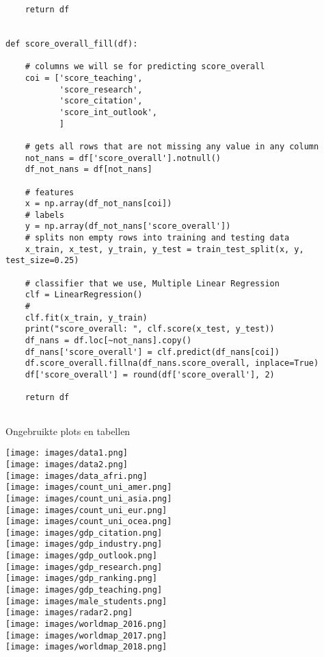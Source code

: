\documentclass{uva-inf-article}
\begin{document}
\begin{lstlisting}
    return df


def score_overall_fill(df):

    # columns we will se for predicting score_overall
    coi = ['score_teaching',
           'score_research',
           'score_citation',
           'score_int_outlook',
           ]

    # gets all rows that are not missing any value in any column
    not_nans = df['score_overall'].notnull()
    df_not_nans = df[not_nans]

    # features
    x = np.array(df_not_nans[coi])
    # labels
    y = np.array(df_not_nans['score_overall'])
    # splits non empty rows into training and testing data
    x_train, x_test, y_train, y_test = train_test_split(x, y, test_size=0.25)

    # classifier that we use, Multiple Linear Regression
    clf = LinearRegression()
    # 
    clf.fit(x_train, y_train)
    print("score_overall: ", clf.score(x_test, y_test))
    df_nans = df.loc[~not_nans].copy()
    df_nans['score_overall'] = clf.predict(df_nans[coi])
    df.score_overall.fillna(df_nans.score_overall, inplace=True)
    df['score_overall'] = round(df['score_overall'], 2)

    return df


\end{lstlisting}
Ongebruikte plots en tabellen
\begin{center}
    

\texttt{[image: images/data1.png]}\\
\texttt{[image: images/data2.png]}\\
\texttt{[image: images/data\_afri.png]}\\
\texttt{[image: images/count\_uni\_amer.png]}\\
\texttt{[image: images/count\_uni\_asia.png]}\\
\texttt{[image: images/count\_uni\_eur.png]}\\
\texttt{[image: images/count\_uni\_ocea.png]}\\
\texttt{[image: images/gdp\_citation.png]}\\
\texttt{[image: images/gdp\_industry.png]}\\
\texttt{[image: images/gdp\_outlook.png]}\\
\texttt{[image: images/gdp\_research.png]}\\
\texttt{[image: images/gdp\_ranking.png]}\\
\texttt{[image: images/gdp\_teaching.png]}\\
\texttt{[image: images/male\_students.png]}\\
\texttt{[image: images/radar2.png]}\\
\texttt{[image: images/worldmap\_2016.png]}\\
\texttt{[image: images/worldmap\_2017.png]}\\
\texttt{[image: images/worldmap\_2018.png]}\\
\end{center}
\end{document}

